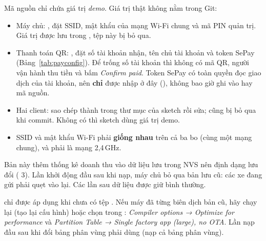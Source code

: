 \begin{lydo}
Mã nguồn chỉ chứa giá trị \emph{demo}. Giá trị thật không nằm trong Git:
\begin{itemize}[nosep]
  \item Máy chủ: , đặt SSID, mật
        khẩu của mạng Wi-Fi chung và mã PIN quản trị. Giá trị
        được lưu trong , tệp này bị  bỏ qua.
  \item Thanh toán QR: , đặt số tài
        khoản nhận, tên chủ tài khoản và token SePay (Bảng~\ref{tab:payconfig}). Để trống
        số tài khoản thì không có mã QR, người vận hành thu tiền và bấm \emph{Confirm paid}. Token SePay có toàn quyền đọc giao dịch của tài
        khoản, nên \textbf{chỉ} được nhập ở đây (), không bao giờ ghi vào
         hay mã nguồn.
  \item Hai client: sao chép  thành  trong thư mục
        của sketch rồi sửa;  cũng bị bỏ qua khi commit. Không có
         thì sketch dùng giá trị demo.
  \item SSID và mật khẩu Wi-Fi phải \textbf{giống nhau} trên cả ba bo (cùng một mạng chung), và phải là mạng 2,4\,GHz.
\end{itemize}
\end{lydo}

\begin{lydo}
Bản này thêm thống kê doanh thu vào dữ liệu lưu trong NVS nên định dạng lưu đổi
( 3). Lần khởi động đầu sau khi nạp, máy chủ bỏ qua bản lưu
cũ: các xe đang gửi phải quẹt vào lại. Các lần sau dữ liệu được giữ bình thường.
\end{lydo}

\begin{lydo}
 chỉ được áp dụng khi chưa có tệp .
Nếu máy đã từng biên dịch bản cũ, hãy chạy lại  (tạo lại
cấu hình) hoặc chọn trong : \emph{Compiler options → Optimize for
performance} và \emph{Partition Table → Single factory app (large), no OTA}. Lần nạp
đầu sau khi đổi bảng phân vùng phải dùng  (nạp cả bảng phân vùng).
\end{lydo}

